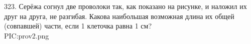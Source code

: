 323. Серёжа согнул две проволоки так, как показано на рисунке, и наложил их друг на друга, не разгибая. Какова наибольшая возможная длина их общей (совпавшей) части, если 1 клеточка равна 1 см?\\
{{PIC:prov2.png}}\\
